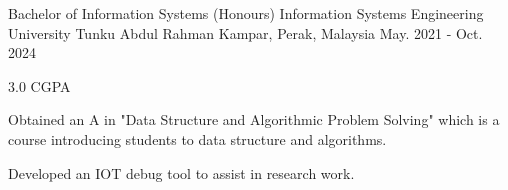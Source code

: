 

\begin{cventries}

  \cventry
    {Bachelor of Information Systems (Honours) Information Systems Engineering} %
    {University Tunku Abdul Rahman} %
    {Kampar, Perak, Malaysia} %
    {May. 2021 - Oct. 2024} %
    {
      \begin{cvitems} %
        \item {3.0 CGPA}
        \item {Obtained an A in "Data Structure and Algorithmic Problem Solving" which is a course introducing students to data structure and algorithms.}
        \item {Developed an IOT debug tool to assist in research work.}
      \end{cvitems}
    }
\end{cventries}
